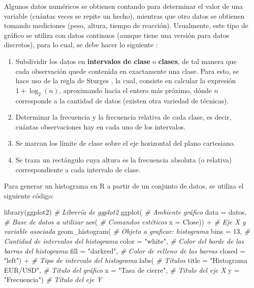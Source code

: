 \documentclass[
]{book}
\newenvironment{Shaded}{\begin{snugshade}}{\end{snugshade}}
\newcommand{\AttributeTok}[1]{\textcolor[rgb]{0.77,0.63,0.00}{#1}}
\newcommand{\CommentTok}[1]{\textcolor[rgb]{0.56,0.35,0.01}{\textit{#1}}}
\newcommand{\DecValTok}[1]{\textcolor[rgb]{0.00,0.00,0.81}{#1}}
\newcommand{\FunctionTok}[1]{\textcolor[rgb]{0.00,0.00,0.00}{#1}}
\newcommand{\NormalTok}[1]{#1}
\newcommand{\SpecialCharTok}[1]{\textcolor[rgb]{0.00,0.00,0.00}{#1}}
\newcommand{\StringTok}[1]{\textcolor[rgb]{0.31,0.60,0.02}{#1}}
\providecommand{\tightlist}{%
  \setlength{\itemsep}{0pt}\setlength{\parskip}{0pt}}
\begin{document}
Algunos datos numéricos se obtienen contando para determinar el valor de una variable (cuántas veces se repite un hecho), mientras que otro datos se obtienen tomando mediciones (peso, altura, tiempo de reacción). Usualmente, este tipo de gráfico se utiliza con datos continuos (aunque tiene una versión para datos discretos), para lo cual, se debe hacer lo siguiente \citep[página 12]{Devore}:

\begin{enumerate}
\def\labelenumi{\arabic{enumi}.}
\tightlist
\item
  Subdividir los datos en \textbf{intervalos de clase} o \textbf{clases}, de tal manera que cada observación quede contenida en exactamente una clase. Para esto, se hace uso de la regla de Sturges \citeyearpar{sturges1926choice}, la cual, consiste en calcular la expresión \(1+\log_2(n)\), aproximando hacia el entero más próximo, dónde \(n\) corresponde a la cantidad de datos (existen otra variedad de técnicas).
\item
  Determinar la frecuencia y la frecuencia relativa de cada clase, es decir, cuántas observaciones hay en cada uno de los intervalos.
\item
  Se marcan los límite de clase sobre el eje horizontal del plano cartesiano.
\item
  Se traza un rectángulo cuya altura es la frecuencia absoluta (o relativa) correspondiente a cada intervalo de clase.
\end{enumerate}

Para generar un histograma en R a partir de un conjunto de datos, se utiliza el siguiente código:

\begin{Shaded}
\begin{Highlighting}[]
\FunctionTok{library}\NormalTok{(ggplot2) }\CommentTok{\# Librería de ggplot2}
\FunctionTok{ggplot}\NormalTok{( }\CommentTok{\# Ambiente gráfico}
  \AttributeTok{data =}\NormalTok{ datos, }\CommentTok{\# Base de datos a utilizar}
       \FunctionTok{aes}\NormalTok{( }\CommentTok{\# Comandos estéticos}
         \AttributeTok{x =}\NormalTok{ Close)) }\SpecialCharTok{+} \CommentTok{\# Eje X y variable asociada }
  \FunctionTok{geom\_histogram}\NormalTok{( }\CommentTok{\# Objeto a graficar: histograma}
    \AttributeTok{bins =} \DecValTok{13}\NormalTok{, }\CommentTok{\# Cantidad de intervalos del histograma}
    \AttributeTok{color =} \StringTok{"white"}\NormalTok{, }\CommentTok{\# Color del borde de las barras del histograma}
    \AttributeTok{fill =} \StringTok{"darkred"}\NormalTok{, }\CommentTok{\# Color de relleno de las barras}
    \AttributeTok{closed =} \StringTok{"left"}\NormalTok{) }\SpecialCharTok{+} \CommentTok{\# Tipo de intervalo del histograma}
  \FunctionTok{labs}\NormalTok{( }\CommentTok{\# Títulos}
    \AttributeTok{title =} \StringTok{"Histograma EUR/USD"}\NormalTok{, }\CommentTok{\# Título del gráfico}
    \AttributeTok{x =} \StringTok{"Tasa de cierre"}\NormalTok{, }\CommentTok{\# Título del eje X}
    \AttributeTok{y =} \StringTok{"Frecuencia"}\NormalTok{) }\CommentTok{\# Título del eje Y}
\end{Highlighting}
\end{Shaded}
\end{document}
